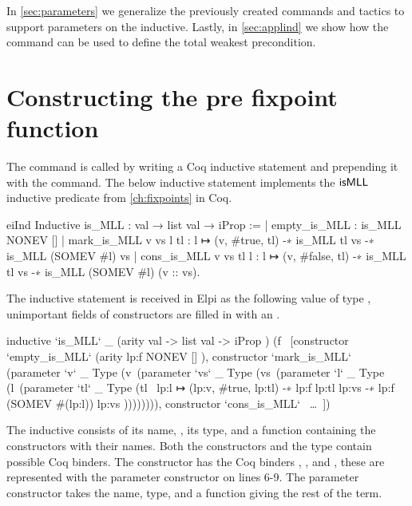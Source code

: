 \documentclass[thesis.tex]{subfiles}
\begin{document}
In \cref{sec:parameters} we generalize the previously created commands and tactics to support parameters on the inductive. Lastly, in \cref{sec:applind} we show how the  command can be used to define the total weakest precondition.

\section{Constructing the pre fixpoint function}\label{sec:pff}
The  command is called by writing a Coq inductive statement and prepending it with the  command. The below inductive statement implements the $\textsf{\upshape isMLL}$ inductive predicate from \cref{ch:fixpoints} in Coq.
\begin{coqcode}
  eiInd
  Inductive is_MLL : val → list val → iProp :=
      | empty_is_MLL : is_MLL NONEV []
      | mark_is_MLL v vs l tl : 
        l ↦ (v, #true, tl) -∗ is_MLL tl vs -∗ 
        is_MLL (SOMEV #l) vs
      | cons_is_MLL v vs tl l : 
        l ↦ (v, #false, tl) -∗ is_MLL tl vs -∗ 
        is_MLL (SOMEV #l) (v :: vs).
\end{coqcode}
The inductive statement is received in Elpi as the following value of type , unimportant fields of constructors are filled in with an \elpii{_}.
\begin{elpicode}
  inductive `is_MLL` _ 
    (arity {{ val -> list val -> iProp }})
    (f \ [constructor `empty_is_MLL` 
            (arity {{ lp:f NONEV [] }}), 
          constructor `mark_is_MLL` 
            (parameter `v` _ Type (v\ 
              (parameter `vs` _ Type (vs\ 
                (parameter `l` _ Type (l\
                  (parameter `tl` _ Type (tl\
                    {{ lp:l ↦ (lp:v, #true, lp:tl) -∗ 
                       lp:f lp:tl lp:vs -∗ 
                       lp:f (SOMEV #(lp:l)) lp:vs }}
              )))))))),
          constructor `cons_is_MLL` ~\ldots~])
\end{elpicode}
The inductive consists of its name, \elpii{`is_MLL`}, its type, and a function containing the constructors with their names. Both the constructors and the type contain possible Coq binders. The constructor  has the Coq binders , ,  and , these are represented with the parameter constructor on lines 6-9. The parameter constructor takes the name, type, and a function giving the rest of the term.
\end{document}
